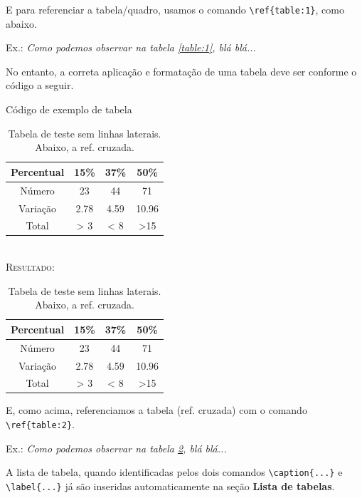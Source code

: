 \documentclass[a4paper,12pt,oneside,openright,extrafontsizes,openbib]{memoir}
\begin{document}
{E para referenciar a tabela/quadro, usamos o comando \verb|\ref{table:1}|, como abaixo.

Ex.: \textit{Como podemos observar na tabela \ref{table:1}, blá blá...}

No entanto, a correta aplicação e formatação de uma tabela deve ser conforme o código a seguir.
\ \\

\begin{codex}{Código de exemplo de tabela}
\begin{table}[h!]
	\begin{center}
	\begin{tabular}{c|c|c|c}
	\hline
	Percentual & 15\% & 37\% & 50\% \\
	\hline
	Número & 23 & 44 & 71 \\
	\hline
	Variação & 2.78 & 4.59 & 10.96 \\
	\hline
	Total & > 3 & < 8 & >15  \\
	\hline
	\end{tabular}
	\caption{Tabela de teste sem linhas laterais. Abaixo, a ref. cruzada.}
	\label{table:2}
	\end{center}
\end{table}
\end{codex}
\ \\

\textsc{Resultado:}

\begin{table}[h!]
	\begin{center}
		\begin{tabular}{c|c|c|c}
			\hline
			Percentual & 15\% & 37\% & 50\% \\
			\hline
			Número & 23 & 44 & 71 \\
			\hline
			Variação & 2.78 & 4.59 & 10.96 \\
			\hline
			Total & > 3 & < 8 & >15  \\
			\hline
		\end{tabular}
		\caption{Tabela de teste sem linhas laterais. Abaixo, a ref. cruzada.}
		\label{table:2}
	\end{center}
\end{table}

E, como acima, referenciamos a tabela (ref. cruzada) com o comando \verb|\ref{table:2}|.

Ex.: \textit{Como podemos observar na tabela \ref{table:2}, blá blá...}

A lista de tabela, quando identificadas pelos dois comandos \verb|\caption{...}| e \verb|\label{...}| já são inseridas automaticamente na seção \textbf{Lista de tabelas}.

}
\end{document}
